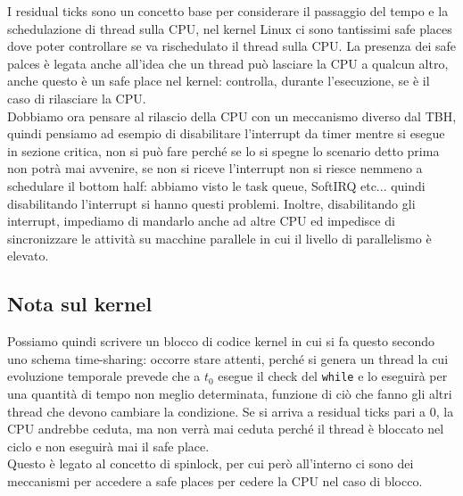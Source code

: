 \documentclass[12pt, oneside]{extbook}
\begin{document}
I residual ticks sono un concetto base per considerare il passaggio del tempo e la schedulazione di thread sulla CPU, nel kernel Linux ci sono tantissimi safe places dove poter controllare se va rischedulato il thread sulla CPU. La presenza dei safe palces è legata anche all'idea che un thread può lasciare la CPU a qualcun altro, anche questo è un safe place nel kernel: controlla, durante l'esecuzione, se è il caso di rilasciare la CPU.\\Dobbiamo ora pensare al rilascio della CPU con un meccanismo diverso dal TBH, quindi pensiamo ad esempio di disabilitare l'interrupt da timer mentre si esegue in sezione critica, non si può fare perché se lo si spegne lo scenario detto prima non potrà mai avvenire, se non si riceve l'interrupt non si riesce nemmeno a schedulare il bottom half: abbiamo visto le task queue, SoftIRQ etc... quindi disabilitando l'interrupt si hanno questi problemi. Inoltre, disabilitando gli interrupt, impediamo di mandarlo anche ad altre CPU ed impedisce di sincronizzare le attività su macchine parallele in cui il livello di parallelismo è elevato.
\subsection{Nota sul kernel}
Possiamo quindi scrivere un blocco di codice kernel in cui si fa questo
secondo uno schema time-sharing: occorre stare attenti, perché si genera un thread la cui evoluzione temporale prevede che a $t_0$ esegue il check del \texttt{while} e lo eseguirà per una quantità di tempo non meglio determinata, funzione di ciò che fanno gli altri thread che devono cambiare la condizione. Se si arriva a residual ticks pari a 0, la CPU andrebbe ceduta, ma non verrà mai ceduta perché il thread è bloccato nel ciclo e non eseguirà mai il safe place.\\Questo è legato al concetto di spinlock, per cui però all'interno ci sono dei meccanismi per accedere a safe places per cedere la CPU nel caso di blocco.
\end{document}
